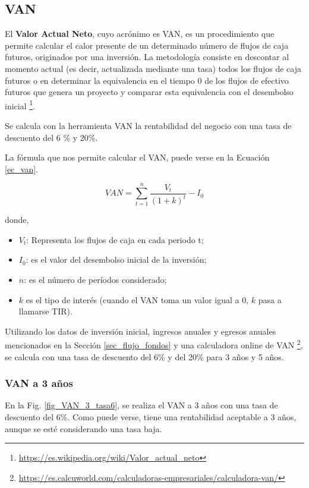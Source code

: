 \documentclass[12pt,a4paper]{book}
\begin{document}
\subsection{VAN}
El \textbf{Valor Actual Neto}, cuyo acrónimo es VAN, es un procedimiento que permite calcular el calor presente de un determinado número de flujos de caja futuros, originados por una inversión. La metodología consiste en descontar al momento actual (es decir, actualizada mediante una tasa) todos los flujos de caja futuros o en determinar la equivalencia en el tiempo 0 de los flujos de efectivo futuros que genera un proyecto y comparar esta equivalencia con el desembolso inicial \footnote{\url{https://es.wikipedia.org/wiki/Valor_actual_neto}}.

Se calcula con la herramienta VAN la rentabilidad del negocio con una tasa de descuento del 6 \% y 20\%.

La fórmula que nos permite calcular el VAN, puede verse en la Ecuación \ref{ec_van}.

\begin{equation}\label{ec_van}
VAN=\sum_{t=1} ^{n} \frac{V_{t}}{(1+k)^t} - I_{0}
\end{equation}

\noindent donde,

\begin{itemize}
\item $V_t$: Representa los flujos de caja en cada periodo t;
\item $I_0$: es el valor del desembolso inicial de la inversión;
\item $n$: es el número de períodos considerado;
\item $k$ es el tipo de interés (cuando el VAN toma un valor igual a 0, $k$ pasa a llamarse TIR). 
\end{itemize}

Utilizando los datos de inversión inicial, ingresos anuales y egresos anuales  mencionados en la Sección \ref{sec_flujo_fondos} y una calculadora online de VAN \footnote{\url{https://es.calcuworld.com/calculadoras-empresariales/calculadora-van/}}, se calcula con una tasa de descuento del 6\% y del 20\% para 3 años y 5 años.

\subsubsection{VAN a 3 años} \label{subsec_VAN_3}

En la Fig. \ref{fig_VAN_3_tasa6}, se realiza el VAN a 3 años con una tasa de descuento del 6\%. Como puede verse, tiene una rentabilidad aceptable a 3 años, aunque se esté considerando una tasa baja.
\end{document}
